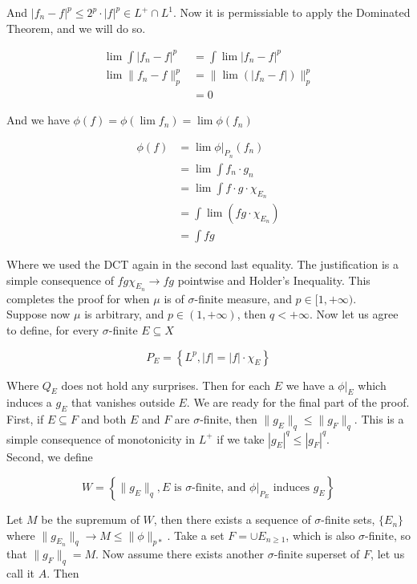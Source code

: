 \documentclass[../main.tex]{subfiles}
\begin{document}
And $|f_n -f|^p \leq 2^p\cdot |f|^p \in L^+\cap L^1$. Now it is permissiable to apply the Dominated Theorem, and we will do so.

\begin{align*}
    \lim \int |f_n -f|^p &= \int \lim |f_n-f|^p\\
    \lim \lVert f_n -f \rVert^p_p &= \lVert \lim (|f_n - f|) \rVert^p_p\\
    &= 0
\end{align*}

And we have $\phi(f) = \phi(\lim f_n) = \lim\phi(f_n)$

\begin{align*}
    \phi(f) &= \lim \phi|_{P_n}(f_n)\\
    &= \lim \int f_n\cdot g_n\\
    &= \lim \int f\cdot g\cdot\chi_{E_n}\\
    &= \int \lim\left(fg\cdot\chi_{E_n}\right)\\
    &= \int fg
\end{align*}

Where we used the DCT again in the second last equality. The justification is a simple consequence of $fg\chi_{E_n}\to fg$ pointwise and Holder's Inequality. This completes the proof for when $\mu$ is of $\sigma$-finite measure, and $p\in[1,+\infty)$.\\

Suppose now $\mu$ is arbitrary, and $p\in(1,+\infty)$, then $q<+\infty$. Now let us agree to define, for every $\sigma$-finite $E\subseteq X$

$$
P_E = \left\{L^p, |f| = |f|\cdot\chi_E\right\}
$$

Where $Q_E$ does not hold any surprises. Then for each $E$ we have a $\phi|_E$ which induces a $g_E$ that vanishes outside $E$. We are ready for the final part of the proof.\\

First, if $E\subseteq F$ and both $E$ and $F$ are $\sigma$-finite, then $\lVert g_E\rVert_q \leq \lVert g_F\rVert_q$. This is a simple consequence of monotonicity in $L^+$ if we take $|g_E|^q\leq |g_F|^q$.\\ 

Second, we define

$$
W = \left\{\lVert g_E\rVert_q, E \text{ is } \sigma \text{-finite, and }\phi|_{P_E} \text{ induces } g_E\right\}
$$

Let $M$ be the supremum of $W$, then there exists a sequence of $\sigma$-finite sets, $\{E_n\}$ where $\lVert g_{E_n}\rVert_q \to M\leq \lVert \phi \rVert_{p*}$. Take a set $F = \cup E_{n\geq 1}$, which is also $\sigma$-finite, so that $\lVert g_F \rVert_q = M$. Now assume there exists another $\sigma$-finite superset of $F$, let us call it $A$. Then 
\end{document}
